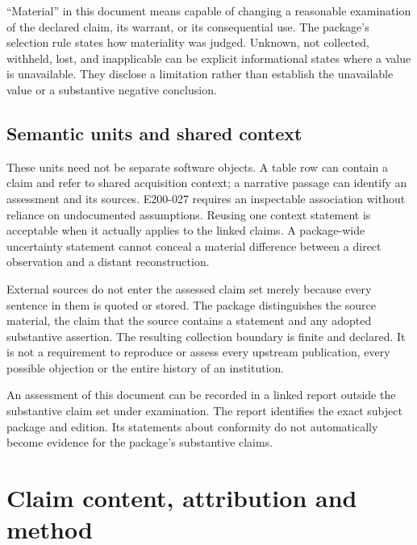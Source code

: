 \documentclass[11pt,a4paper]{article}
\begin{document}
``Material'' in this document means capable of changing a reasonable examination of the declared claim, its warrant, or its consequential use. The package's selection rule states how materiality was judged. Unknown, not collected, withheld, lost, and inapplicable can be explicit informational states where a value is unavailable. They disclose a limitation rather than establish the unavailable value or a substantive negative conclusion.


\subsection{Semantic units and shared context}

These units need not be separate software objects. A table row can contain a claim and refer to shared acquisition context; a narrative passage can identify an assessment and its sources. E200-027 requires an inspectable association without reliance on undocumented assumptions. Reusing one context statement is acceptable when it actually applies to the linked claims. A package-wide uncertainty statement cannot conceal a material difference between a direct observation and a distant reconstruction.

External sources do not enter the assessed claim set merely because every sentence in them is quoted or stored. The package distinguishes the source material, the claim that the source contains a statement and any adopted substantive assertion. The resulting collection boundary is finite and declared. It is not a requirement to reproduce or assess every upstream publication, every possible objection or the entire history of an institution.

An assessment of this document can be recorded in a linked report outside the substantive claim set under examination. The report identifies the exact subject package and edition. Its statements about conformity do not automatically become evidence for the package's substantive claims.
\section{Claim content, attribution and method}
\end{document}
